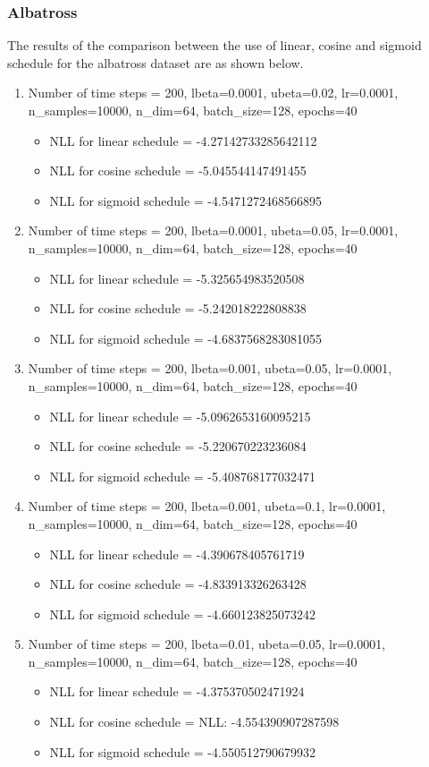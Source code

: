 \documentclass[a4paper,12pt]{article}
\begin{document}
\subsubsection*{Albatross}
The results of the comparison between the use of linear, cosine and sigmoid schedule for the albatross dataset are as shown below.
\begin{enumerate}
  \item Number of time steps = 200, lbeta=0.0001, ubeta=0.02, lr=0.0001, n\_samples=10000, n\_dim=64, batch\_size=128, epochs=40
  \begin{itemize}
  \item NLL for linear schedule = -4.27142733285642112
  \item NLL for cosine schedule = -5.045544147491455
  \item NLL for sigmoid schedule = -4.5471272468566895
  \end{itemize}
    \item Number of time steps = 200, lbeta=0.0001, ubeta=0.05, lr=0.0001, n\_samples=10000, n\_dim=64, batch\_size=128, epochs=40
  \begin{itemize}
  \item NLL for linear schedule = -5.325654983520508
  \item NLL for cosine schedule = -5.242018222808838
  \item NLL for sigmoid schedule = -4.6837568283081055
  \end{itemize}  \item Number of time steps = 200, lbeta=0.001, ubeta=0.05, lr=0.0001, n\_samples=10000, n\_dim=64, batch\_size=128, epochs=40
  \begin{itemize}
  \item NLL for linear schedule = -5.0962653160095215
  \item NLL for cosine schedule = -5.220670223236084
  \item NLL for sigmoid schedule = -5.408768177032471
  \end{itemize}
    \item Number of time steps = 200, lbeta=0.001, ubeta=0.1, lr=0.0001, n\_samples=10000, n\_dim=64, batch\_size=128, epochs=40
  \begin{itemize}
  \item NLL for linear schedule = -4.390678405761719
  \item NLL for cosine schedule = -4.833913326263428
  \item NLL for sigmoid schedule = -4.660123825073242
  \end{itemize}
    \item Number of time steps = 200, lbeta=0.01, ubeta=0.05, lr=0.0001, n\_samples=10000, n\_dim=64, batch\_size=128, epochs=40
  \begin{itemize}
  \item NLL for linear schedule = -4.375370502471924
  \item NLL for cosine schedule = NLL: -4.554390907287598
  \item NLL for sigmoid schedule = -4.550512790679932
  \end{itemize}
\end{enumerate}
\end{document}
